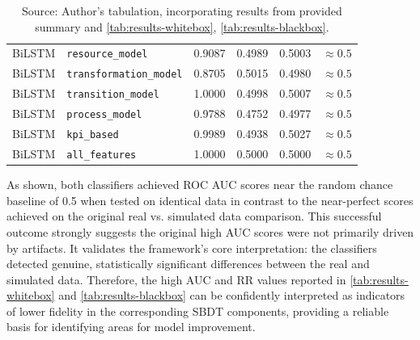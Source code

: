 \begin{table}[htbp]
{\begin{tabular}{l l c c c c}
            BiLSTM              & \texttt{resource\_model}               & 0.9087                  & 0.4989                           & 0.5003                                & $\approx 0.5$            \\
            BiLSTM              & \texttt{transformation\_model}         & 0.8705                  & 0.5015                           & 0.4980                                & $\approx 0.5$            \\
            BiLSTM              & \texttt{transition\_model}             & 1.0000                  & 0.4998                           & 0.5007                                & $\approx 0.5$            \\
            BiLSTM              & \texttt{process\_model}                & 0.9788                  & 0.4752                           & 0.4977                                & $\approx 0.5$            \\
            BiLSTM              & \texttt{kpi\_based}                    & 0.9989                  & 0.4938                           & 0.5027                                & $\approx 0.5$            \\
            BiLSTM              & \texttt{all\_features}                 & 1.0000                  & 0.5000                           & 0.5000                                & $\approx 0.5$            \\
            \bottomrule
        \end{tabular}%
    }
    \caption*{Source: Author's tabulation, incorporating results from provided summary and \autoref{tab:results-whitebox}, \autoref{tab:results-blackbox}.}
\end{table}

As shown, both classifiers achieved ROC AUC scores near the random chance baseline of 0.5 when tested on identical data in contrast to the near-perfect scores achieved on the original real vs. simulated data comparison.
This successful outcome strongly suggests the original high AUC scores were not primarily driven by artifacts. It validates the framework's core interpretation: the classifiers detected genuine, statistically significant differences between the real and simulated data. Therefore, the high AUC and RR values reported in \autoref{tab:results-whitebox} and \autoref{tab:results-blackbox} can be confidently interpreted as indicators of lower fidelity in the corresponding SBDT components, providing a reliable basis for identifying areas for model improvement.

